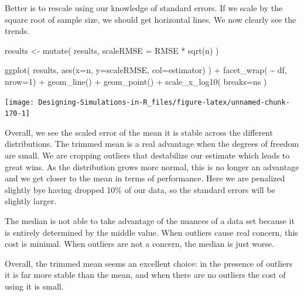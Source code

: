 \documentclass[
]{book}
\newenvironment{Shaded}{\begin{snugshade}}{\end{snugshade}}
\newcommand{\AttributeTok}[1]{\textcolor[rgb]{0.77,0.63,0.00}{#1}}
\newcommand{\DecValTok}[1]{\textcolor[rgb]{0.00,0.00,0.81}{#1}}
\newcommand{\FunctionTok}[1]{\textcolor[rgb]{0.00,0.00,0.00}{#1}}
\newcommand{\NormalTok}[1]{#1}
\newcommand{\OtherTok}[1]{\textcolor[rgb]{0.56,0.35,0.01}{#1}}
\newcommand{\SpecialCharTok}[1]{\textcolor[rgb]{0.00,0.00,0.00}{#1}}
\begin{document}
Better is to rescale using our knowledge of standard errors. If we scale by
the square root of sample size, we should get horizontal lines. We now
clearly see the trends.

\begin{Shaded}
\begin{Highlighting}[]
\NormalTok{results }\OtherTok{\textless{}{-}} \FunctionTok{mutate}\NormalTok{( results, }\AttributeTok{scaleRMSE =}\NormalTok{ RMSE }\SpecialCharTok{*} \FunctionTok{sqrt}\NormalTok{(n) )}
\end{Highlighting}
\end{Shaded}

\begin{Shaded}
\begin{Highlighting}[]
\FunctionTok{ggplot}\NormalTok{( results, }\FunctionTok{aes}\NormalTok{(}\AttributeTok{x=}\NormalTok{n, }\AttributeTok{y=}\NormalTok{scaleRMSE, }\AttributeTok{col=}\NormalTok{estimator) ) }\SpecialCharTok{+}
    \FunctionTok{facet\_wrap}\NormalTok{( }\SpecialCharTok{\textasciitilde{}}\NormalTok{ df, }\AttributeTok{nrow=}\DecValTok{1}\NormalTok{) }\SpecialCharTok{+}
    \FunctionTok{geom\_line}\NormalTok{() }\SpecialCharTok{+} \FunctionTok{geom\_point}\NormalTok{() }\SpecialCharTok{+}
    \FunctionTok{scale\_x\_log10}\NormalTok{( }\AttributeTok{breaks=}\NormalTok{ns )}
\end{Highlighting}
\end{Shaded}

\begin{center}\texttt{[image: Designing-Simulations-in-R\_files/figure-latex/unnamed-chunk-170-1]} \end{center}

Overall, we see the scaled error of the mean it is stable across the
different distributions. The trimmed mean is a real advantage when the
degrees of freedom are small. We are cropping outliers that destabilize our
estimate which leads to great wins. As the distribution grows more normal,
this is no longer an advantage and we get closer to the mean in terms of
performance. Here we are penalized slightly bye having dropped 10\% of our
data, so the standard errors will be slightly larger.

The median is not able to take advantage of the nuances of a data set because
it is entirely determined by the middle value. When outliers cause real
concern, this cost is minimal. When outliers are not a concern, the median is
just worse.

Overall, the trimmed mean seems an excellent choice: in the presence of
outliers it is far more stable than the mean, and when there are no outliers
the cost of using it is small.
\end{document}
